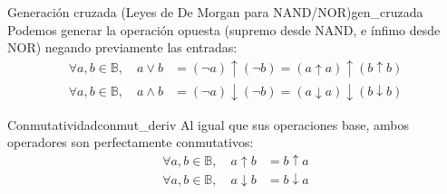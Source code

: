 \begin{teorema}{Generación cruzada (Leyes de De Morgan para NAND/NOR)}{gen_cruzada}
Podemos generar la operación opuesta (supremo desde NAND, e ínfimo desde NOR) negando previamente las entradas:
\begin{align*}
    \forall a, b \in \mathbb{B}, \quad a \vee b &= (\neg a) \uparrow (\neg b) = (a \uparrow a) \uparrow (b \uparrow b) \\
    \forall a, b \in \mathbb{B}, \quad a \wedge b &= (\neg a) \downarrow (\neg b) = (a \downarrow a) \downarrow (b \downarrow b)
\end{align*}
\end{teorema}

\begin{teorema}{Conmutatividad}{conmut_deriv}
Al igual que sus operaciones base, ambos operadores son perfectamente conmutativos:
\begin{align*}
    \forall a, b \in \mathbb{B}, \quad a \uparrow b &= b \uparrow a \\
    \forall a, b \in \mathbb{B}, \quad a \downarrow b &= b \downarrow a
\end{align*}
\end{teorema}

